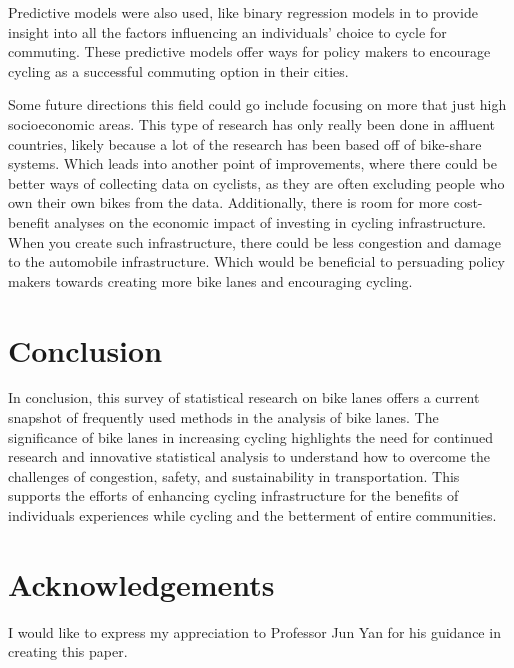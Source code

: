 \documentclass[12pt, letterpaper]{article}
\begin{document}
Predictive models were also used, like binary regression models in \citet{2Yujun2019} to provide insight into all the factors influencing an individuals' choice to cycle for commuting. These predictive models offer ways for policy makers to encourage cycling as a successful commuting option in their cities.\par

Some future directions this field could go include focusing on more that just high socioeconomic areas. This type of research has only really been done in affluent countries, likely because a lot of the research has been based off of bike-share systems. Which leads into another point of improvements, where there could be better ways of collecting data on cyclists, as they are often excluding people who own their own bikes from the data. Additionally, there is room for more cost-benefit analyses on the economic impact of investing in cycling infrastructure. When you create such infrastructure, there could be less congestion and damage to the automobile infrastructure. Which would be beneficial to persuading policy makers towards creating more bike lanes and encouraging cycling. 


\section{Conclusion}
\label{sec:conc}

In conclusion, this survey of statistical research on bike lanes offers a current snapshot of frequently used methods in the analysis of bike lanes. The significance of bike lanes in increasing cycling highlights the need for continued research and innovative statistical analysis to understand how to overcome the challenges of congestion, safety, and sustainability in transportation. This supports the efforts of enhancing cycling infrastructure for the benefits of individuals experiences while cycling and the betterment of entire communities. 


\section{Acknowledgements}
\label{sec:acknow}

I would like to express my appreciation to Professor Jun Yan for his guidance in creating this paper. 


\end{document}

